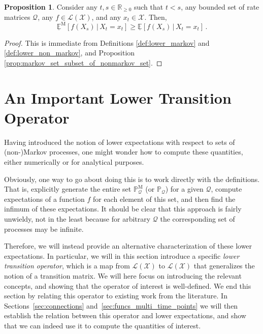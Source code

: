 \documentclass[10pt]{paper}
\theoremstyle{definition}
\newtheorem{proposition}[theorem]{Proposition}
\newcommand{\reals}{\mathbb{R}}
\newcommand{\realsnonneg}{\reals_{\geq 0}}
\newcommand{\states}{\mathcal{X}}
\newcommand{\processes}{\mathbb{P}}
\newcommand{\mprocesses}{\processes^{\mathrm{M}}}
\newcommand{\gambles}{\mathcal{L}}
\newcommand{\gamblesX}{\gambles(\states)}
\newcommand{\rateset}{\mathcal{Q}}
\begin{document}
\begin{proposition}\label{prop:lower_exp_markov_bounded_by_nonmarkov}
Consider any $t,s\in\realsnonneg$ such that $t<s$, any bounded set of rate matrices $\rateset$, any $f\in\gamblesX$, and any $x_t\in\states$. Then,
\begin{equation*}
\underline{\mathbb{E}}^\mathrm{M}[f(X_s)\,\vert\,X_t=x_t] \geq \underline{\mathbb{E}}[f(X_s)\,\vert\,X_t=x_t]\,.
\end{equation*}
\end{proposition}
\begin{proof}
This is immediate from Definitions \ref{def:lower_markov} and \ref{def:lower_non_markov}, and Proposition \ref{prop:markov_set_subset_of_nonmarkov_set}.
\end{proof}

\section{An Important Lower Transition Operator}
\label{sec:lowertrans}

Having introduced the notion of lower expectations with respect to sets of (non-)Markov processes, one might wonder how to compute these quantities, either numerically or for analytical purposes. 

Obviously, one way to go about doing this is to work directly with the definitions. That is, explicitly generate the entire set $\mprocesses_\rateset$ (or $\processes_\rateset$) for a given $\rateset$, compute expectations of a function $f$ for each element of this set, and then find the infimum of these expectations. It should be clear that this approach is fairly unwieldy, not in the least because for arbitrary $\rateset$ the corresponding set of processes may be infinite.

Therefore, we will instead provide an alternative characterization of these lower expectations. In particular, we will in this section introduce a specific \emph{lower transition operator}, which is a map from $\gamblesX$ to $\gamblesX$ that generalizes the notion of a transition matrix. We will here focus on introducing the relevant concepts, and showing that the operator of interest is well-defined. We end this section by relating this operator to existing work from the literature. In Sections~\ref{sec:connections} and~\ref{sec:funcs_multi_time_points} we will then establish the relation between this operator and lower expectations, and show that we can indeed use it to compute the quantities of interest.
\end{document}
